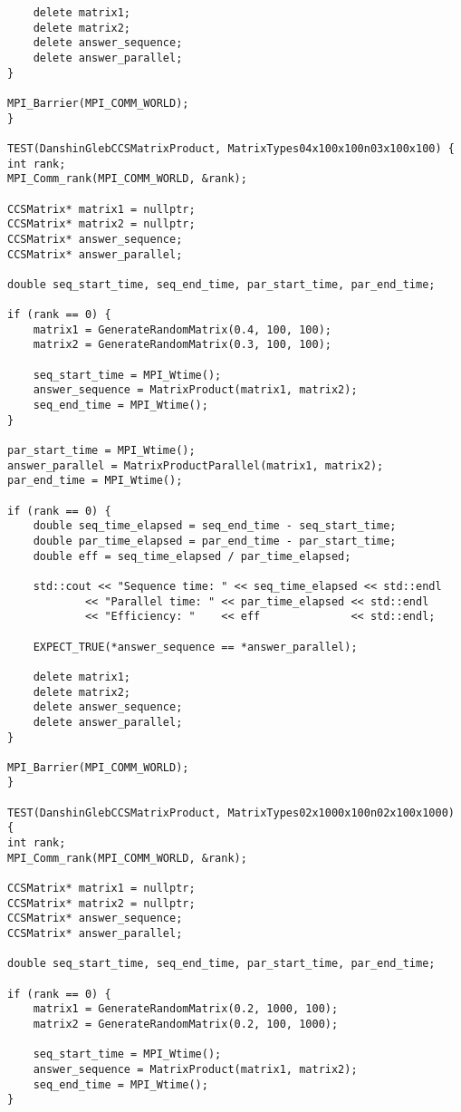 \documentclass{report}
\begin{document}
\begin{lstlisting}
    delete matrix1;
    delete matrix2;
    delete answer_sequence;
    delete answer_parallel;
}

MPI_Barrier(MPI_COMM_WORLD);
}

TEST(DanshinGlebCCSMatrixProduct, MatrixTypes04x100x100n03x100x100) {
int rank;
MPI_Comm_rank(MPI_COMM_WORLD, &rank);

CCSMatrix* matrix1 = nullptr;
CCSMatrix* matrix2 = nullptr;
CCSMatrix* answer_sequence;
CCSMatrix* answer_parallel;

double seq_start_time, seq_end_time, par_start_time, par_end_time;

if (rank == 0) {
    matrix1 = GenerateRandomMatrix(0.4, 100, 100);
    matrix2 = GenerateRandomMatrix(0.3, 100, 100);

    seq_start_time = MPI_Wtime();
    answer_sequence = MatrixProduct(matrix1, matrix2);
    seq_end_time = MPI_Wtime();
}

par_start_time = MPI_Wtime();
answer_parallel = MatrixProductParallel(matrix1, matrix2);
par_end_time = MPI_Wtime();

if (rank == 0) {
    double seq_time_elapsed = seq_end_time - seq_start_time;
    double par_time_elapsed = par_end_time - par_start_time;
    double eff = seq_time_elapsed / par_time_elapsed;

    std::cout << "Sequence time: " << seq_time_elapsed << std::endl
            << "Parallel time: " << par_time_elapsed << std::endl
            << "Efficiency: "    << eff              << std::endl;

    EXPECT_TRUE(*answer_sequence == *answer_parallel);

    delete matrix1;
    delete matrix2;
    delete answer_sequence;
    delete answer_parallel;
}

MPI_Barrier(MPI_COMM_WORLD);
}

TEST(DanshinGlebCCSMatrixProduct, MatrixTypes02x1000x100n02x100x1000) {
int rank;
MPI_Comm_rank(MPI_COMM_WORLD, &rank);

CCSMatrix* matrix1 = nullptr;
CCSMatrix* matrix2 = nullptr;
CCSMatrix* answer_sequence;
CCSMatrix* answer_parallel;

double seq_start_time, seq_end_time, par_start_time, par_end_time;

if (rank == 0) {
    matrix1 = GenerateRandomMatrix(0.2, 1000, 100);
    matrix2 = GenerateRandomMatrix(0.2, 100, 1000);

    seq_start_time = MPI_Wtime();
    answer_sequence = MatrixProduct(matrix1, matrix2);
    seq_end_time = MPI_Wtime();
}


\end{lstlisting}
\end{document}
